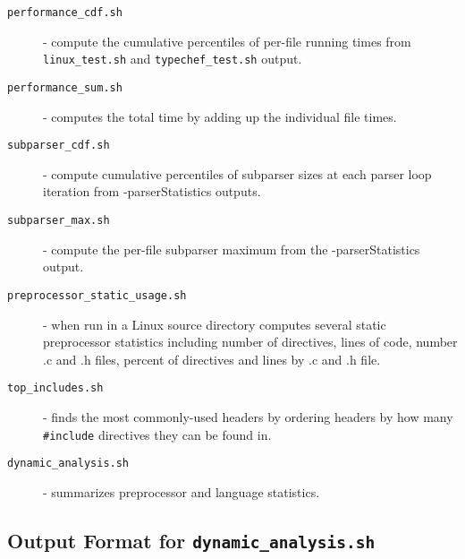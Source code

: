\documentclass{report}
\begin{document}
\begin{description}
\item[\texttt{performance\_cdf.sh}] - compute the cumulative percentiles of
  per-file running times from \verb"linux_test.sh" and \verb"typechef_test.sh"
  output.
\item[\texttt{performance\_sum.sh}] - computes the total time by adding up
  the individual file times.
\item[\texttt{subparser\_cdf.sh}] - compute cumulative percentiles of
  subparser sizes at each parser loop iteration from -parserStatistics
  outputs.
\item[\texttt{subparser\_max.sh}] - compute the per-file subparser maximum
  from the -parserStatistics output.
\item[\texttt{preprocessor\_static\_usage.sh}] - when run in a Linux source
  directory computes several static preprocessor statistics including
  number of directives, lines of code, number .c and .h files, percent
  of directives and lines by .c and .h file.
\item[\texttt{top\_includes.sh}] - finds the most commonly-used headers by
  ordering headers by how many \verb"#include" directives they can be found
  in.
\item[\texttt{dynamic\_analysis.sh}] - summarizes preprocessor and language
  statistics.
\end{description}



\subsection*{Output Format for \texttt{dynamic\_analysis.sh}}
\end{document}
